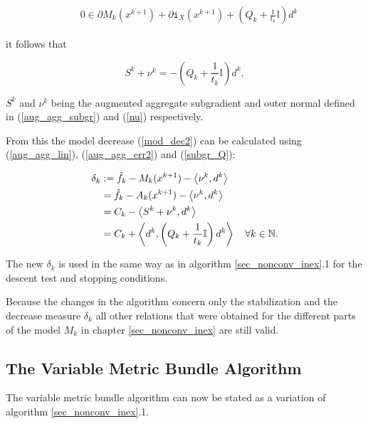 \begin{align*}
	& 0 \in \partial M_k(x^{k+1})+\partial\mathtt{i}_{X}(x^{k+1})+\left(Q_k+\frac{1}{t_k}\mathbb{I}\right)d^k
	\label{Noll_opt_cond}
\end{align*}

it follows that 

\begin{equation}
	S^k+\nu^k = -\left(Q_k+\frac{1}{t_k}\mathbb{I}\right)d^k,
	\label{subgr_Q}
\end{equation}

\(S^k\) and \(\nu^k\) being the augmented aggregate subgradient and outer normal defined in (\ref{aug_agg_subgr}) and (\ref{nu}) respectively.

From this the model decrease (\ref{mod_dec2}) can be calculated using (\ref{aug_agg_lin}), (\ref{aug_agg_err2}) and (\ref{subgr_Q}):

\begin{equation}
\begin{split}
	\delta_k  &:= \hat{f}_k - M_k(x^{k+1}) - \left\langle\nu^k,d^k\right\rangle\\
	&= \hat{f}_k - A_k(x^{k+1}) - \left\langle\nu^k,d^k\right\rangle\\
	&= C_k - \left\langle S^k+\nu^k,d^k\right\rangle \\
	&= C_k + \left\langle d^k,\left(Q_k+\frac{1}{t_k}\mathbb{I}\right)d^k\right\rangle \quad \forall k \in \mathbb{N}.
	\label{Noll_delta}
\end{split}
\end{equation}

The new \(\delta_k\) is used in the same way as in algorithm \ref{sec_nonconv_inex}.1 for the descent test and stopping conditions.

Because the changes in the algorithm concern only the stabilization and the decrease measure \(\delta_k\) all other relations that were obtained for the different parts of the model \(M_k\) in chapter \ref{sec_nonconv_inex} are still valid.

\subsection{The Variable Metric Bundle Algorithm}

The variable metric bundle algorithm can now be stated as a variation of algorithm \ref{sec_nonconv_inex}.1.



